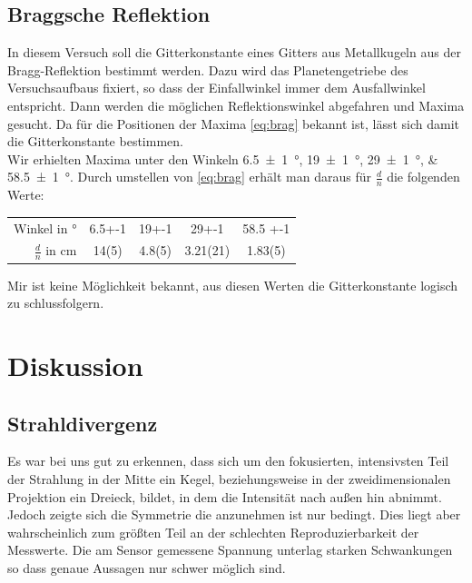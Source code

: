 \subsection{Braggsche Reflektion}
In diesem Versuch soll die Gitterkonstante eines Gitters aus Metallkugeln aus der Bragg-Reflektion bestimmt werden. Dazu wird das Planetengetriebe des Versuchsaufbaus fixiert, so dass der Einfallwinkel immer dem Ausfallwinkel entspricht. Dann werden die möglichen Reflektionswinkel abgefahren und Maxima gesucht. Da für die Positionen der Maxima \eqref{eq:brag} bekannt ist, lässt sich damit die Gitterkonstante bestimmen.\\
Wir erhielten Maxima unter den Winkeln \SIlist{6.5+-1; 19+-1; 29+-1; 58.5 +-1}{\degree}. Durch umstellen von \eqref{eq:brag} erhält man daraus für $ \frac{d}{n} $ die folgenden Werte: \\
\begin{tabular}{r|S[table-figures-decimal=1]S[table-figures-decimal=1]SS}
Winkel in \si{\degree} & 6.5+-1 & 19+-1 & 29+-1 & 58.5 +-1 \\
$ \frac{d}{n} $ in \si{\centi\meter} & 14(5) & 4.8(5) & 3.21(21) & 1.83(5)
\end{tabular}
Mir ist keine Möglichkeit bekannt, aus diesen Werten die Gitterkonstante logisch zu schlussfolgern.
\newpage
\section{Diskussion} 
\subsection{Strahldivergenz}
Es war bei uns gut zu erkennen, dass sich um den fokusierten, intensivsten Teil der Strahlung in der Mitte ein Kegel, beziehungsweise in der zweidimensionalen Projektion ein Dreieck, bildet, in dem die Intensität nach außen hin abnimmt. Jedoch zeigte sich die Symmetrie die anzunehmen ist nur bedingt. Dies liegt aber wahrscheinlich zum größten Teil an der schlechten Reproduzierbarkeit der Messwerte. Die am Sensor gemessene Spannung unterlag starken Schwankungen so dass genaue Aussagen nur schwer möglich sind. 
